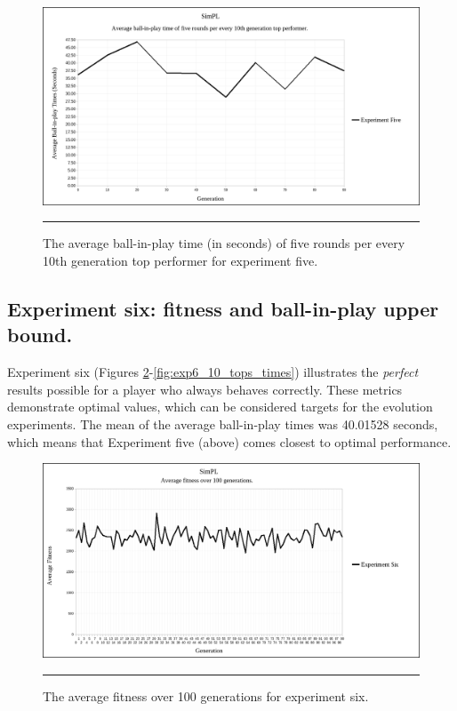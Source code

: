 \begin{figure}[ht!]  
  \centering
  \includegraphics[width=5in]{../Figures/Chapter3/exp5_10_tops_times.png}
  \rule{35em}{0.5pt}
  \caption[Experiment Five Top Performers Tournament]{The average ball-in-play time (in seconds) of five rounds per every 10th generation top performer for experiment five.}
  \label{fig:exp5_10_tops_times}
\end{figure}

\subsection[Experiment Six]{Experiment six: fitness and ball-in-play upper bound.}

Experiment six (Figures \ref{fig:exp6_avg_fit}-\ref{fig:exp6_10_tops_times}) illustrates the \textit{perfect} results possible for a player who always behaves correctly. These metrics demonstrate optimal values, which can be considered targets for the evolution experiments. The mean of the average ball-in-play times was 40.01528 seconds, which means that Experiment five (above) comes closest to optimal performance.

\begin{figure}[ht!]  
  \centering
  \includegraphics[width=5in]{../Figures/Chapter3/exp6_avg_fit.png}
  \rule{35em}{0.5pt}
  \caption[Experiment Six Average Fitness]{The average fitness over 100 generations for experiment six.}
  \label{fig:exp6_avg_fit}
\end{figure}

